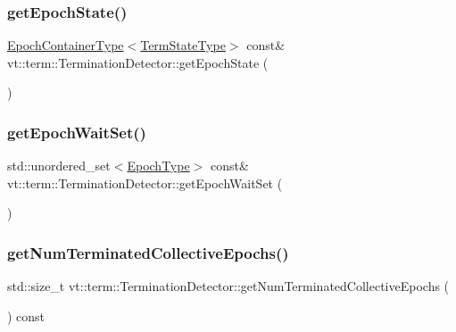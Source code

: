 \subsubsection{\texorpdfstring{get\+Epoch\+State()}{getEpochState()}}
{\footnotesize\ttfamily \hyperlink{structvt_1_1term_1_1_termination_detector_a69e2615b61e072977463eea5b20b7933}{Epoch\+Container\+Type}$<$\hyperlink{structvt_1_1term_1_1_term_action_ae4c635b69751d887666814700ed64d65}{Term\+State\+Type}$>$ const\& vt\+::term\+::\+Termination\+Detector\+::get\+Epoch\+State (\begin{DoxyParamCaption}{ }\end{DoxyParamCaption})\hspace{0.3cm}{\ttfamily [inline]}}

\mbox{\label{structvt_1_1term_1_1_termination_detector_aed77c0e79a681705e941314e7415df35}} 
\subsubsection{\texorpdfstring{get\+Epoch\+Wait\+Set()}{getEpochWaitSet()}}
{\footnotesize\ttfamily std\+::unordered\+\_\+set$<$\hyperlink{namespacevt_a985a5adf291c34a3ca263b3378388236}{Epoch\+Type}$>$ const\& vt\+::term\+::\+Termination\+Detector\+::get\+Epoch\+Wait\+Set (\begin{DoxyParamCaption}{ }\end{DoxyParamCaption})\hspace{0.3cm}{\ttfamily [inline]}}

\mbox{\label{structvt_1_1term_1_1_termination_detector_af0b08c4a5dd17d893e677ad280bef84a}} 
\subsubsection{\texorpdfstring{get\+Num\+Terminated\+Collective\+Epochs()}{getNumTerminatedCollectiveEpochs()}}
{\footnotesize\ttfamily std\+::size\+\_\+t vt\+::term\+::\+Termination\+Detector\+::get\+Num\+Terminated\+Collective\+Epochs (\begin{DoxyParamCaption}{ }\end{DoxyParamCaption}) const}




